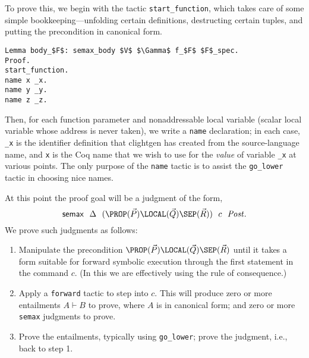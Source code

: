 \documentclass[12pt,fleqn,openany,oneside,showtrims]{memoir}
\begin{document}
To prove this, we begin with the tactic \lstinline{start_function},
which takes care of some simple bookkeeping---unfolding certain
definitions, destructing certain tuples, and putting the precondition
in canonical form.

\begin{lstlisting}
Lemma body_$F$: semax_body $V$ $\Gamma$ f_$F$ $F$_spec.
Proof.
start_function.
name x _x.
name y _y.
name z _z.
\end{lstlisting}

Then, for each function parameter and nonaddressable local variable 
(scalar local variable whose address is never taken), we write a
\lstinline{name} declaration; in each case, \lstinline{_x} is the
identifier definition that clightgen has created from the source-language
name, and \lstinline{x} is the Coq name that we wish to use for
the \emph{value} of variable \lstinline{_x} at various points.
The only purpose of the \lstinline{name}
tactic is to assist the \lstinline{go_lower} tactic in choosing nice names.

At this point the proof goal will be a judgment of the form,
\[
\mathsf{semax}~~\Delta~~(\PROP(\vec{P}) \LOCAL(\vec{Q}) \SEP(\vec{R}))~~c~~\mathit{Post}.
\]
We prove such judgments as follows:
\begin{enumerate}
\item Manipulate the precondition 
$\PROP(\vec{P}) \LOCAL(\vec{Q}) \SEP(\vec{R})$
until it takes a form suitable for forward symbolic execution
through the first statement in the command $c$.  (In this we are
effectively using the rule of consequence.)
\item Apply a \lstinline{forward} tactic to step into $c$.
This will produce zero or more entailments $A\vdash B$ to prove,
where $A$ is in canonical form; 
and zero or more 
\lstinline{semax} judgments to prove.
\item Prove the entailments, typically using \lstinline{go_lower};
prove the judgment, i.e., back to step 1.
\end{enumerate}
\end{document}

